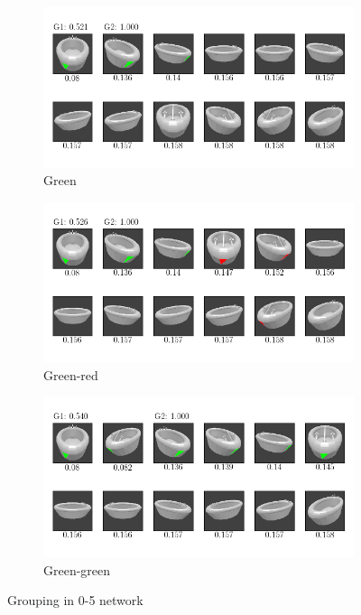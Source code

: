 \begin{figure}
	\centering
	\begin{subfigure}{\textwidth}
		\includegraphics[trim=10 20 10 20, clip]{images/mn-sl-0-5-20/bathtub_0107_1_grouping.png}
		\caption{Green}
		\label{fig:grouping-0-5-green}
	\end{subfigure}
	\begin{subfigure}{\textwidth}
		\includegraphics[trim=10 20 10 20, clip]{images/mn-sl-0-5-20/bathtub_0107_3_grouping.png}
		\caption{Green-red}
		\label{fig:grouping-0-5-green-red}
	\end{subfigure}
	\begin{subfigure}{\textwidth}
		\includegraphics[trim=10 20 10 20, clip]{images/mn-sl-0-5-20/bathtub_0107_4_grouping.png}
		\caption{Green-green}
		\label{fig:grouping-0-5-green-green}
	\end{subfigure}
	\caption[Grouping in 0-5 network]{Grouping in 0-5 network}
	\label{fig:grouping-0-5}
\end{figure}
